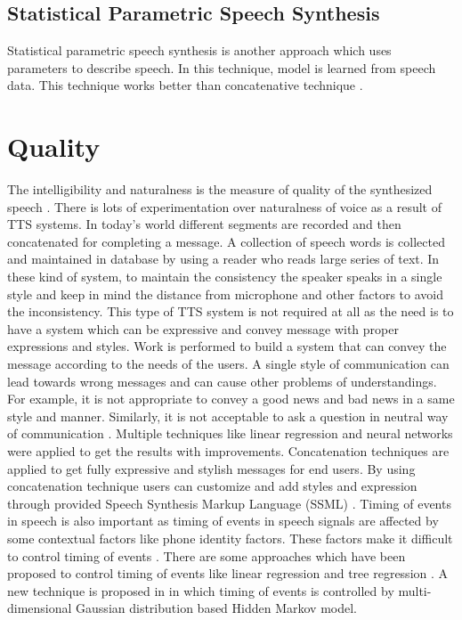 \subsection{Statistical Parametric Speech Synthesis}
Statistical parametric speech synthesis is another approach which uses parameters to describe
speech. In this technique, model is learned from speech data. This technique works better than
concatenative technique \cite{merritt2013investigating}. 

\section{Quality}
The intelligibility and naturalness is the measure of quality of the synthesized speech \cite{swetha2013text}. 
There is lots of experimentation over naturalness of voice as a result of TTS
systems. In today’s world different segments are recorded and then concatenated for completing a
message. A collection of speech words is collected and maintained in database by using a reader
who reads large series of text. In these kind of system, to maintain the consistency the speaker
speaks in a single style and keep in mind the distance from microphone and other factors to avoid
the inconsistency. This type of TTS system is not required at all as the need is to have a system
which can be expressive and convey message with proper expressions and styles. Work is
performed to build a system that can convey the message according to the needs of the users. A
single style of communication can lead towards wrong messages and can cause other problems of
understandings. For example, it is not appropriate to convey a good news and bad news in a same
style and manner. Similarly, it is not acceptable to ask a question in neutral way of communication \cite{eide2004corpus}.
Multiple techniques like linear regression and neural networks were applied
to get the results with improvements. Concatenation techniques are applied to get fully
expressive and stylish messages for end users. By using concatenation technique users can
customize and add styles and expression through provided Speech Synthesis Markup Language (SSML) \cite{eide2004corpus}. 
Timing of events in speech is also important as timing of events in
speech signals are affected by some contextual factors like phone identity factors. These factors
make it difficult to control timing of events \cite{tokuda2000speech}. There are some approaches which have been proposed
to control timing of events like linear regression \cite{kaiki1992linguistic} and tree regression \cite{riley1992tree}. 
A new technique is proposed in \cite{tokuda2000speech} in which timing of events is
controlled by multi-dimensional Gaussian distribution based Hidden Markov model.

